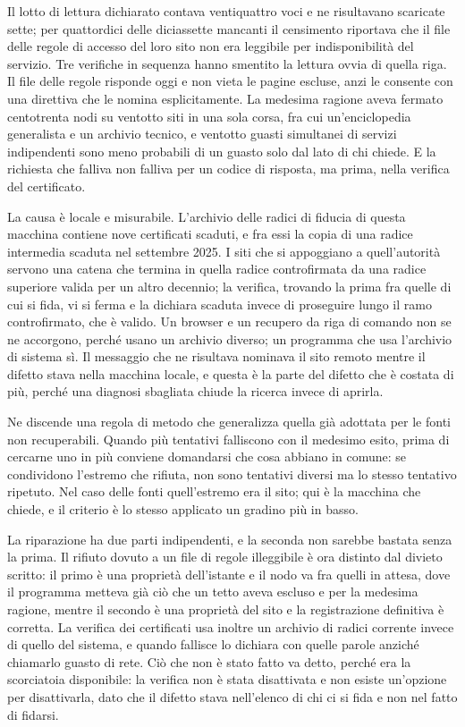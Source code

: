 Il lotto di lettura dichiarato contava ventiquattro voci e ne risultavano scaricate sette; per quattordici delle diciassette mancanti il censimento riportava che il file delle regole di accesso del loro sito non era leggibile per indisponibilità del servizio. Tre verifiche in sequenza hanno smentito la lettura ovvia di quella riga. Il file delle regole risponde oggi e non vieta le pagine escluse, anzi le consente con una direttiva che le nomina esplicitamente. La medesima ragione aveva fermato centotrenta nodi su ventotto siti in una sola corsa, fra cui un'enciclopedia generalista e un archivio tecnico, e ventotto guasti simultanei di servizi indipendenti sono meno probabili di un guasto solo dal lato di chi chiede. E la richiesta che falliva non falliva per un codice di risposta, ma prima, nella verifica del certificato.

La causa è locale e misurabile. L'archivio delle radici di fiducia di questa macchina contiene nove certificati scaduti, e fra essi la copia di una radice intermedia scaduta nel settembre 2025. I siti che si appoggiano a quell'autorità servono una catena che termina in quella radice controfirmata da una radice superiore valida per un altro decennio; la verifica, trovando la prima fra quelle di cui si fida, vi si ferma e la dichiara scaduta invece di proseguire lungo il ramo controfirmato, che è valido. Un browser e un recupero da riga di comando non se ne accorgono, perché usano un archivio diverso; un programma che usa l'archivio di sistema sì. Il messaggio che ne risultava nominava il sito remoto mentre il difetto stava nella macchina locale, e questa è la parte del difetto che è costata di più, perché una diagnosi sbagliata chiude la ricerca invece di aprirla.

Ne discende una regola di metodo che generalizza quella già adottata per le fonti non recuperabili. Quando più tentativi falliscono con il medesimo esito, prima di cercarne uno in più conviene domandarsi che cosa abbiano in comune: se condividono l'estremo che rifiuta, non sono tentativi diversi ma lo stesso tentativo ripetuto. Nel caso delle fonti quell'estremo era il sito; qui è la macchina che chiede, e il criterio è lo stesso applicato un gradino più in basso.

La riparazione ha due parti indipendenti, e la seconda non sarebbe bastata senza la prima. Il rifiuto dovuto a un file di regole illeggibile è ora distinto dal divieto scritto: il primo è una proprietà dell'istante e il nodo va fra quelli in attesa, dove il programma metteva già ciò che un tetto aveva escluso e per la medesima ragione, mentre il secondo è una proprietà del sito e la registrazione definitiva è corretta. La verifica dei certificati usa inoltre un archivio di radici corrente invece di quello del sistema, e quando fallisce lo dichiara con quelle parole anziché chiamarlo guasto di rete. Ciò che non è stato fatto va detto, perché era la scorciatoia disponibile: la verifica non è stata disattivata e non esiste un'opzione per disattivarla, dato che il difetto stava nell'elenco di chi ci si fida e non nel fatto di fidarsi.

